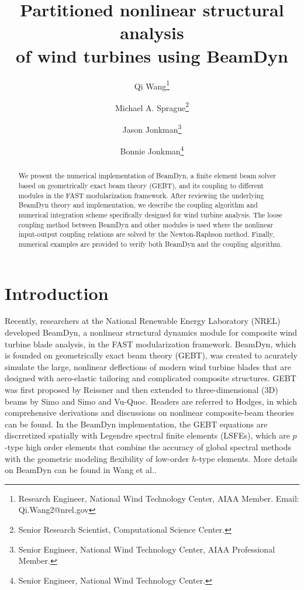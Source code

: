 \documentclass{aiaa-tc}
\title{Partitioned nonlinear structural analysis\\
of wind turbines using BeamDyn}
\author[]{Qi Wang\thanks{Research Engineer, National Wind Technology Center, AIAA Member. Email: Qi.Wang2@nrel.gov}}
\author[]{Michael A. Sprague\thanks{Senior Research Scientist, 
Computational Science Center.}}
\author[]{Jason Jonkman\thanks{Senior Engineer, National Wind Technology Center, AIAA Professional Member.}}
\author[]{Bonnie Jonkman\thanks{Senior Engineer, National Wind Technology Center.}}
\affil[]{National Renewable Energy Laboratory, Golden, CO 80401}
\begin{document}
\maketitle

\begin{abstract}
{We present the numerical implementation of BeamDyn, a finite element beam solver based on geometrically exact beam theory (GEBT), and its coupling to different modules in the FAST modularization framework. 
After reviewing the underlying BeamDyn theory and implementation, we describe the coupling algorithm and numerical integration scheme specifically designed for wind turbine analysis. 
The loose coupling method between BeamDyn and other modules is used where the nonlinear input-output coupling relations are solved by the Newton-Raphson method. 
Finally, numerical examples are provided to verify both BeamDyn and the coupling algorithm. }     
\end{abstract}

\section{Introduction} 
Recently, researchers at the National Renewable Energy Laboratory (NREL) 
developed BeamDyn, a nonlinear structural dynamics module for composite wind turbine blade analysis, in the FAST modularization framework. 
BeamDyn, which is founded on geometrically exact beam theory (GEBT), was created to acurately simulate the large, nonlinear deflections of modern wind turbine blades that are designed with aero-elastic tailoring and complicated composite structures.
GEBT was first proposed by Reissner\cite{Ressiner1973} and then extended to three-dimensional (3D) beams by Simo\cite{Simo1985} and Simo and Vu-Quoc\cite{Simo1986}. 
Readers are referred to
Hodges\cite{HodgesBeamBook}, in which comprehensive derivations and discussions
on nonlinear composite-beam theories can be found. 
In the BeamDyn implementation, the GEBT equations are discrretized spatially with Legendre spectral finite elements (LSFEs), which are $p$-type high order elements that combine the accuracy of global spectral methods with the geometric modeling flexibility of low-order $h$-type elements.
More details on BeamDyn can be found in Wang et al.\cite{Wang:GEBT2014}.
\end{document}
